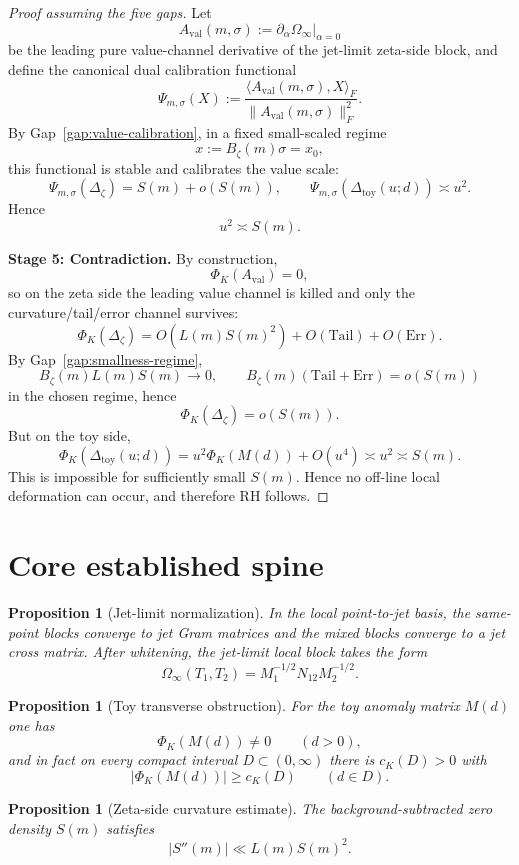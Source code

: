\documentclass[11pt]{article}
\newtheorem{proposition}[theorem]{Proposition}
\newcommand{\RH}{\mathrm{RH}}
\newcommand{\PsiCal}{\Psi}
\newcommand{\val}{\mathrm{val}}
\newcommand{\toy}{\mathrm{toy}}
\newcommand{\zetaSide}{\zeta}
\newcommand{\Err}{\mathrm{Err}}
\newcommand{\Tail}{\mathrm{Tail}}
\begin{document}
\begin{proof}[Proof assuming the five gaps]
Let
\[
A_{\val}(m,\sigma):=\partial_\alpha \Omega_\infty\big|_{\alpha=0}
\]
be the leading pure value-channel derivative of the jet-limit zeta-side block,
and define the canonical dual calibration functional
\[
\PsiCal_{m,\sigma}(X)
:=
\frac{\langle A_{\val}(m,\sigma),X\rangle_F}
{\|A_{\val}(m,\sigma)\|_F^2}.
\]
By Gap~\ref{gap:value-calibration}, in a fixed small-scaled regime
\[
x:=B_\zeta(m)\sigma = x_0,
\]
this functional is stable and calibrates the value scale:
\[
\PsiCal_{m,\sigma}(\Delta_{\zetaSide}) = S(m)+o(S(m)),
\qquad
\PsiCal_{m,\sigma}(\Delta_{\toy}(u;d)) \asymp u^2.
\]
Hence
\[
u^2 \asymp S(m).
\]

\medskip
\noindent
\textbf{Stage 5: Contradiction.}
By construction,
\[
\Phi_K(A_{\val})=0,
\]
so on the zeta side the leading value channel is killed and only the
curvature/tail/error channel survives:
\[
\Phi_K(\Delta_{\zetaSide})
=
O(L(m)S(m)^2)+O(\Tail)+O(\Err).
\]
By Gap~\ref{gap:smallness-regime},
\[
B_\zeta(m)L(m)S(m)\to 0,
\qquad
B_\zeta(m)(\Tail+\Err)=o(S(m))
\]
in the chosen regime, hence
\[
\Phi_K(\Delta_{\zetaSide})=o(S(m)).
\]
But on the toy side,
\[
\Phi_K(\Delta_{\toy}(u;d))
=
u^2\Phi_K(M(d))+O(u^4)
\asymp u^2
\asymp S(m).
\]
This is impossible for sufficiently small $S(m)$.
Hence no off-line local deformation can occur, and therefore $\RH$ follows.
\end{proof}

\section{Core established spine}

\begin{proposition}[Jet-limit normalization]
In the local point-to-jet basis, the same-point blocks converge to jet Gram
matrices and the mixed blocks converge to a jet cross matrix. After whitening,
the jet-limit local block takes the form
\[
\Omega_\infty(T_1,T_2)=M_1^{-1/2}N_{12}M_2^{-1/2}.
\]
\end{proposition}

\begin{proposition}[Toy transverse obstruction]
For the toy anomaly matrix $M(d)$ one has
\[
\Phi_K(M(d))\neq 0
\qquad(d>0),
\]
and in fact on every compact interval $D\subset(0,\infty)$ there is
$c_K(D)>0$ with
\[
|\Phi_K(M(d))|\ge c_K(D)
\qquad(d\in D).
\]
\end{proposition}

\begin{proposition}[Zeta-side curvature estimate]
The background-subtracted zero density $S(m)$ satisfies
\[
|S''(m)|\ll L(m)S(m)^2.
\]
\end{proposition}
\end{document}
